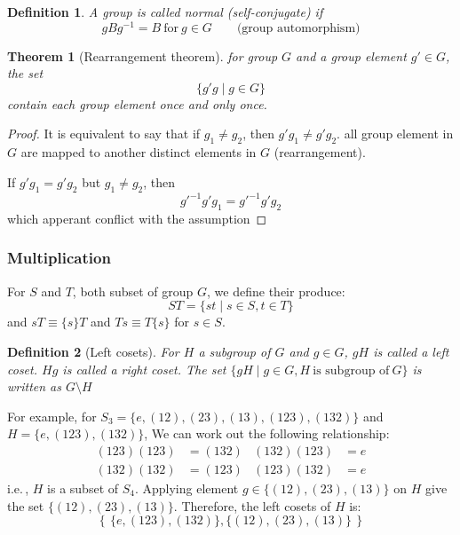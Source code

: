 \documentclass{amsart}
\newtheorem{definition}{Definition}
\newtheorem{theorem}{Theorem}
\begin{document}
\begin{definition}
    A group is called normal (self-conjugate) if 
    \[
        gBg^{-1} = B\ \text{for}\ g \in G \qquad \text{(group automorphism)}    
    \]
\end{definition}

\begin{theorem}[Rearrangement theorem]
    for group $G$ and a group element $g'\in G$, the set 
    \[\{g'g \mid g \in G\}\]
    contain each group element once and only once.
\end{theorem}
\begin{proof}
    It is equivalent to say that if $g_1 \neq g_2$, then $g'g_1 \neq g'g_2$. all group element in $G$ are mapped 
    to another distinct elements in $G$ (rearrangement).

    If $g'g_1 = g'g_2$ but $g_1 \neq g_2$, then 
    \[ g'^{-1}g'g_1 = g'^{-1}g'g_2 \] which apperant conflict with the assumption
\end{proof}

\vspace{10pt}

\subsubsection*{Multiplication} 
For $S$ and $T$, both subset of group $G$, we define their produce:
\begin{equation}
    ST = \{st\mid s\in S, t \in T\}
\end{equation}
and $sT \equiv \{s\}T $ and $Ts \equiv T\{s\} $ for $s \in S$.

\vspace{10pt}

\begin{definition}[Left cosets]
    For $H$ a subgroup of $G$ and $g \in G$, $gH$ is called a left coset. $Hg$ is called a right coset. 
    The set $\{gH \mid g \in G, H\ \text{is subgroup of}\ G\}$ is written as $G\setminus H$
\end{definition}

For example, for $S_3 = \{e, (12), (23), (13), (123), (132)\}$ 
and $H = \{e,(123),(132)\}$, We can work out the following relationship:
\begin{align*}
    (123)(123) &= (132) &  (132)(123) &= e \\
    (132)(132) &= (123) &  (123)(132) &= e 
\end{align*}
i.e.\,, $H$ is a subset of $S_4$. Applying element $g \in \{(12), (23), (13)\}$ on $H$
give the set $\{(12), (23), (13)\}$. Therefore, the left cosets of $H$ is:
\[
    \left\{\, \{e,(123),(132)\}, \{(12), (23), (13)\}\, \right\}    
\]
\end{document}
